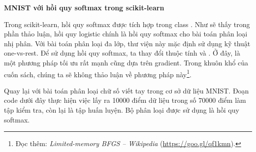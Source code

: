  
 
\newpage 
\textbf{MNIST với hồi quy softmax trong scikit-learn}

Trong scikit-learn, hồi quy softmax được tích hợp trong class
. Như sẽ thấy trong phần
thảo luận, hồi quy logistic chính là hồi quy softmax cho bài toán phân loại nhị
phân. Với bài toán phân loại đa lớp, thư viện này mặc định sử dụng kỹ thuật
one-vs-rest. Để sử dụng hồi quy softmax, ta thay đổi thuộc tính
 và .
Ở đây,  là một phương pháp tối ưu rất mạnh cũng dựa trên
gradient. Trong khuôn khổ của cuốn sách, chúng ta sẽ không thảo luận về phương
pháp này\footnote{Đọc thêm: \textit{Limited-memory BFGS -- Wikipedia} (\url{https://goo.gl/qf1kmn}).}. 

Quay lại với bài toán phân loại chữ số viết tay trong cơ sở dữ liệu MNIST. Đoạn
code dưới đây thực hiện việc lấy ra 10000 điểm dữ liệu trong số 70000 điểm làm
tập kiểm tra, còn lại là tập huấn luyện. Bộ phân loại được sử dụng là hồi quy softmax.

 
 
 

